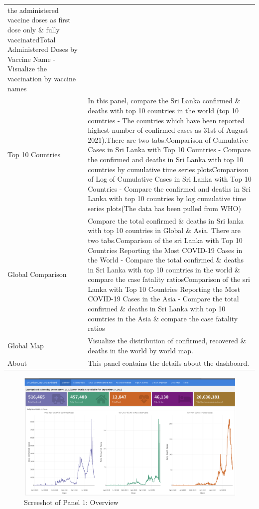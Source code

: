 \documentclass[
]{article}
\begin{document}
\begin{longtable}[]{@{}
  >{\raggedright\arraybackslash}p{}
  >{\raggedright\arraybackslash}p{}@{}}
the administered vaccine doses as first dose only \& fully
vaccinated\hfill\break * Total Administered Doses by Vaccine Name -
Visualize the vaccination by vaccine names\hfill\break \\
Top 10 Countries & In this panel, compare the Sri Lanka confirmed \&
deaths with top 10 countries in the world (top 10 countries - The
countries which have been reported highest number of confirmed cases as
31st of August 2021).\hfill\break There are two
tabs.\hfill\break * Comparison of Cumulative Cases in Sri Lanka with Top
10 Countries - Compare the confirmed and deaths in Sri Lanka with top 10
countries by cumulative time series plots\hfill\break * Comparison of
Log of Cumulative Cases in Sri Lanka with Top 10 Countries - Compare the
confirmed and deaths in Sri Lanka with top 10 countries by log
cumulative time series plots\hfill\break (The data has been pulled from
WHO)\hfill\break \\
Global Comparison & Compare the total confirmed \& deaths in Sri lanka
with top 10 countries in Global \& Asia. There are two
tabs.\hfill\break * Comparison of the sri Lanka with Top 10 Countries
Reporting the Most COVID-19 Cases in the World - Compare the total
confirmed \& deaths in Sri Lanka with top 10 countries in the world \&
compare the case fatality ratios\hfill\break * Comparison of the sri
Lanka with Top 10 Countries Reporting the Most COVID-19 Cases in the
Asia - Compare the total confirmed \& deaths in Sri Lanka with top 10
countries in the Asia \& compare the case fatality ratios\hfill\break \\
Global Map & Visualize the distribution of confirmed, recovered \&
deaths in the world by world map.\hfill\break \\
About & This panel contains the details about the dashboard. \\
\bottomrule
\end{longtable}

\begin{figure}

{\centering \includegraphics[width=0.8\linewidth]{Images/image1} 

}

\caption{Screeshot of Panel 1: Overview}\label{fig:unnamed-chunk-5}
\end{figure}
\end{document}
